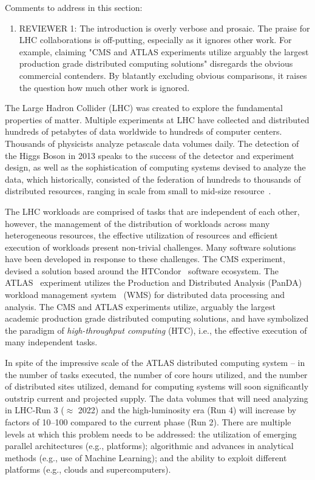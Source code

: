 \ifreview
Comments to address in this section:
\begin{enumerate}
	\color{red} 
	\item REVIEWER 1: The introduction is overly verbose and prosaic. The
	praise for LHC collaborations is off-putting, especially as it ignores
	other work. For example, claiming "CMS and ATLAS experiments utilize
	arguably the largest production grade distributed computing solutions"
	disregards the obvious commercial contenders. By blatantly excluding
	obvious comparisons, it raises the question how much other work is
	ignored. 
\end{enumerate}
\fi

The Large Hadron Collider (LHC) was created to explore the fundamental
properties of matter. Multiple experiments at LHC have collected and
distributed hundreds of petabytes of data worldwide to hundreds of computer
centers. Thousands of physicists analyze petascale data volumes daily. The
detection of the Higgs Boson in 2013 speaks to the success of the detector
and experiment design, as well as the sophistication of computing systems
devised to analyze the data, which historically, consisted of the federation
of hundreds to thousands of distributed resources, ranging in scale from
small to mid-size resource~\cite{foster2003grid}.

The LHC workloads are comprised of tasks that are independent of each other,
however, the management of the distribution of workloads across many
heterogeneous resources, the effective utilization of resources and efficient
execution of workloads present non-trivial challenges. Many software solutions
have been developed in response to these challenges. The CMS experiment,
devised a solution based around the HTCondor~\cite{thain2005distributed}
software ecosystem. The ATLAS~\cite{Aad:2008} experiment utilizes the
Production and Distributed Analysis (PanDA) workload management
system~\cite{Maeno2011} (WMS) for distributed data processing and analysis.
The CMS and ATLAS experiments utilize, arguably the largest academic
production grade distributed computing solutions, and have symbolized the
paradigm of {\it high-throughput computing} (HTC), i.e., the effective
execution of many independent tasks.

In spite of the impressive scale of the ATLAS distributed computing system --
in the number of tasks executed, the number of core hours utilized, and the
number of distributed sites utilized,  demand for computing systems will soon
significantly outstrip current and projected supply.   The data volumes that
will need analyzing in LHC-Run 3 ($\approx$ 2022) and the high-luminosity
era (Run 4) will increase by factors of 10--100 compared to the current phase
(Run 2). There are multiple levels at which this problem needs to be
addressed: the utilization of emerging parallel architectures (e.g.,
platforms); algorithmic and advances in analytical methods (e.g., use of
Machine Learning); and the ability to exploit different platforms (e.g.,
clouds and supercomputers).

